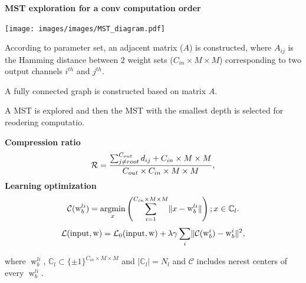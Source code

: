 \documentclass[landscape,a0paper,fontscale=0.292]{baposter}
\newcommand{\subheadercolor}{black}
\DeclareMathOperator*{\argmin}{argmin}
\DeclareMathOperator*{\inputs}{input}
\DeclareMathOperator*{\w}{w}
\begin{document}
\begin{poster}
{\begin{minipage}[t]{0.33\linewidth}
	\textbf{\color{\subheadercolor}MST exploration for a conv computation order}
	    \begin{center}
	        \texttt{[image: images/images/MST\_diagram.pdf]}
	    \end{center}
	    \vspace{-1em}
	    \begin{itemize}
	    	{\scriptsize \item According to parameter set, an adjacent matrix ($A$) is constructed, where $A_{ij}$ is the Hamming distance between $2$ weight sets ($C_{in}\times M\times M$) corresponding to two output channels $i^{th}$ and $j^{th}$.
	    	\item A fully connected graph is constructed based on matrix $A$.	
	    	\item A MST is explored and then the MST with the smallest depth is selected for reodering computatio.}
	    \end{itemize}
	   \textbf{\color{\subheadercolor} Compression ratio} 
	    \begin{equation}
	    	\footnotesize
	    	\label{eq:ratio-param}
	    	\mathcal{R} = \frac{\sum_{j\ne root}^{C_{out}}d_{ij} + C_{in} \times M \times M}{C_{out} \times C_{in} \times M \times M},
	    \end{equation}
	    \textbf{\color{\subheadercolor} Learning optimization} 
	    \begin{equation}
	    	\footnotesize
	    	\label{eq:update_center}
	    	\mathcal{C}({\w}_b^{li}) = \underset{x}{\argmin}\left(\sum_{i=1}^{C_{in}\times M \times M} \lVert x- {\w}_b^{li}\rVert\right);
	    	x \in \mathbb{C}_l.
	    \end{equation}
	    \begin{equation}
	    	\footnotesize
	    	\label{eq:loss}
	    	\mathcal{L}(\inputs,{\w}) = \mathcal{L}_0(\inputs, {\w}) + \lambda\gamma\sum_i \lVert\mathcal{C}({\w}_b^{i}) - {\w}_b^{i} \rVert^2,
	    \end{equation}
	    \begin{itemize}
	    	{\scriptsize \item where $\w_b^{li}$, $\mathbb{C}_l \subset \{\pm1\}^{C_{in} \times M \times M}$ and $|\mathbb{C}_l| = N_l$ and $\mathcal{C}$ includes nerest centers of every $\w_b^{li}$.}
	    \end{itemize}
\end{minipage}
\hfill
\begin{minipage}[t]{0.33\linewidth}

\end{minipage}}
\end{poster}
\end{document}
